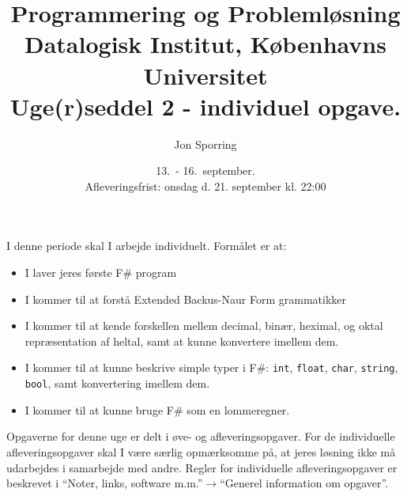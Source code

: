 \documentclass[a4paper,12pt]{article}
\title{Programmering og Problemløsning\\Datalogisk Institut,
  Københavns Universitet\\Uge(r)seddel 2 - individuel opgave.}
\author{Jon Sporring}
\date{13.\ - 16.\ september.\\Afleveringsfrist: onsdag d. 21. september kl. 22:00}
\begin{document}
\maketitle

I denne periode skal I arbejde individuelt. Formålet er at:
\begin{itemize}
\item I laver jeres første F\# program
\item I kommer til at forstå Extended Backus-Naur Form grammatikker
\item I kommer til at kende forskellen mellem decimal, binær, heximal, og oktal repræsentation af heltal, samt at kunne konvertere imellem dem.
\item I kommer til at kunne beskrive simple typer i F\#: \lstinline{int}, \lstinline{float}, \lstinline{char}, \lstinline{string}, \lstinline{bool}, samt konvertering imellem dem.
\item I kommer til at kunne bruge F\# som en lommeregner.
\end{itemize}

Opgaverne for denne uge er delt i øve- og afleveringsopgaver. For de individuelle afleveringsopgaver skal I være særlig opmærksomme på, at jeres løsning ikke må udarbejdes i samarbejde med andre. Regler for individuelle afleveringsopgaver er beskrevet i "`Noter, links, software m.m."'$\rightarrow$"`Generel information om opgaver"'.
\end{document}
